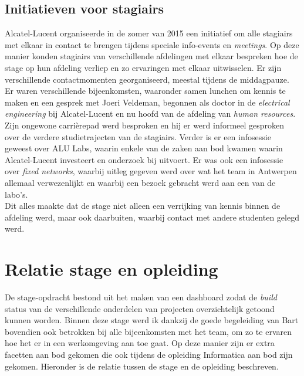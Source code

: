 \documentclass[10pt,a4paper]{article}
\begin{document}
\subsection{Initiatieven voor stagiairs}
\label{interns}
Alcatel-Lucent organiseerde in de zomer van 2015 een initiatief om alle stagiairs met elkaar in contact te brengen tijdens speciale info-events en \textit{meetings}. Op deze manier konden stagiairs van verschillende afdelingen met elkaar bespreken hoe de stage op hun afdeling verliep en zo ervaringen met elkaar uitwisselen. Er zijn verschillende contactmomenten georganiseerd, meestal tijdens de middagpauze. Er waren verschillende bijeenkomsten, waaronder samen lunchen om kennis te maken en een gesprek met Joeri Veldeman, begonnen als doctor in de \textit{electrical engineering} bij Alcatel-Lucent en nu hoofd van de afdeling van \textit{human resources}. Zijn ongewone carri\`erepad werd besproken en hij er werd informeel gesproken over de verdere studietrajecten van de stagiairs.
Verder is er een infosessie geweest over ALU Labs, waarin enkele van de zaken aan bod kwamen waarin Alcatel-Lucent investeert en onderzoek bij uitvoert. Er was ook een infosessie over \textit{fixed networks}, waarbij uitleg gegeven werd over wat het team in Antwerpen allemaal verwezenlijkt en waarbij een bezoek gebracht werd aan een van de labo's.\\
Dit alles maakte dat de stage niet alleen een verrijking van kennis binnen de afdeling werd, maar ook daarbuiten, waarbij contact met andere studenten gelegd werd.

\section{Relatie stage en opleiding}
\label{relatie}
De stage-opdracht bestond uit het maken van een dashboard zodat de \textit{build} status van de verschillende onderdelen van projecten overzichtelijk getoond kunnen worden. Binnen deze stage werd ik dankzij de goede begeleiding van Bart bovendien ook betrokken bij alle bijeenkomsten met het team, om zo te ervaren hoe het er in een werkomgeving aan toe gaat. Op deze manier zijn er extra facetten aan bod gekomen die ook tijdens de opleiding Informatica aan bod zijn gekomen. Hieronder is de relatie tussen de stage en de opleiding beschreven.
\end{document}
